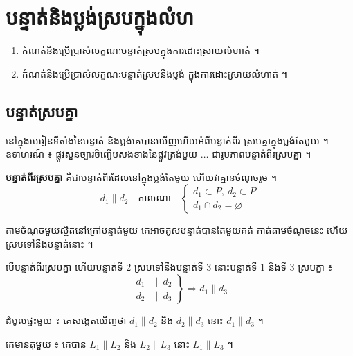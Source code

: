 \chapter{បន្ទាត់និងប្លង់ស្របក្នុងលំហ}

\begin{objBox}[វត្ថុបំណង]
\begin{enumerate}[1]
  \item កំណត់និងប្រើប្រាស់លក្ខណៈបន្ទាត់ស្របក្នុងការដោះស្រាយលំហាត់ ។
  \item កំណត់និងប្រើប្រាស់លក្ខណៈបន្ទាត់ស្របនឹងប្លង់ ក្នុងការដោះស្រាយលំហាត់ ។
\end{enumerate}
\end{objBox}

\section{បន្ទាត់ស្របគ្នា}
នៅក្នុងមេរៀនទីតាំងនៃបន្ទាត់ និងប្លង់គេបានឃើញហើយអំពីបន្ទាត់ពីរ ស្របគ្នាក្នុងប្លង់តែមួយ ។ ឧទាហរណ៍ ៖ ផ្លូវសួនច្បារចិញ្ចើមសងខាងនៃផ្លូវត្រង់មួយ $\dots$ ជារូបភាពបន្ទាត់ពីរស្របគ្នា ។

\begin{definition}[និយមន័យ]
\textbf{បន្ទាត់ពីរស្របគ្នា} គឺជាបន្ទាត់ពីរដែលនៅក្នុងប្លង់តែមួយ ហើយវាគ្មានចំណុចរួម ។
\[
d_1 \parallel d_2 \quad \text{កាលណា} \quad \begin{cases} d_1 \subset P,\ d_2 \subset P\\ d_1 \cap d_2 = \varnothing \end{cases}
\]
\end{definition}

\begin{theorem}[លក្ខណៈទី ១]
តាមចំណុចមួយស្ថិតនៅក្រៅបន្ទាត់មួយ គេអាចគូសបន្ទាត់បានតែមួយគត់ កាត់តាមចំណុចនេះ ហើយស្របទៅនឹងបន្ទាត់នោះ ។
\end{theorem}

\begin{theorem}[លក្ខណៈទី ២]
បើបន្ទាត់ពីរស្របគ្នា ហើយបន្ទាត់ទី $2$ ស្របទៅនឹងបន្ទាត់ទី $3$ នោះបន្ទាត់ទី $1$ និងទី $3$ ស្របគ្នា ៖
\[
\left.\begin{aligned} d_1 &\parallel d_2\\ d_2 &\parallel d_3 \end{aligned}\right\} \Rightarrow d_1 \parallel d_3
\]
\end{theorem}

\begin{example}[ឧទាហរណ៍ ១]
ដំបូលផ្ទះមួយ ៖ គេសង្កេតឃើញថា $d_1 \parallel d_2$ និង $d_2 \parallel d_3$ នោះ $d_1 \parallel d_3$ ។
\end{example}
\begin{example}[ឧទាហរណ៍ ២]
គេមានតុមួយ ៖ គេបាន $L_1 \parallel L_2$ និង $L_2 \parallel L_3$ នោះ $L_1 \parallel L_3$ ។
\end{example}

